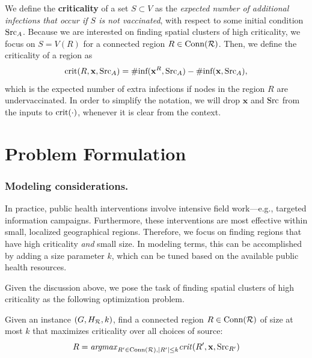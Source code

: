 \setlength{\abovedisplayskip}{3pt}
\setlength{\belowdisplayskip}{3pt}


We define the \textbf{criticality} of a set $S\subset V$ as
the \emph{expected number of additional infections that occur if $S$ is not vaccinated},
with respect to some initial condition $\text{Src}_A$.
Because we are interested on finding spatial clusters of high criticality, 
we focus on $S=V(R)$ for a connected region $R\in\text{Conn}(\mathcal{R})$.
Then, we define the criticality of a region as
\[
\text{crit}(R, \mathbf{x}, \text{Src}_A) = \#\text{inf}(\mathbf{x}^R, \text{Src}_A) - \#\text{inf}(\mathbf{x}, \text{Src}_A),
\]
which is the expected number of extra infections if nodes in the region $R$ are undervaccinated. In order to simplify the notation, we will drop $\mathbf{x}$ and $\text{Src}$ from the inputs to $\text{crit}(\cdot)$, whenever it is clear from the context.



\section{Problem Formulation}
\label{sec:problem-statement}

\subsubsection{Modeling considerations.} In practice, public health interventions involve intensive field work---e.g., targeted information campaigns. Furthermore, these interventions are most effective within small, localized geographical regions. Therefore, we focus on finding regions that have high criticality \emph{and} small size. In modeling terms, this can be accomplished by adding a size parameter $k$, which can be tuned based on the available public health resources. 

Given the discussion above, we pose the task of finding spatial clusters of high criticality as the following optimization problem.
\begin{problem}[$\maxcrit{}(G, H_{\R}, k)$]
\label{prob:maxcrit}
Given an instance $(G, H_{\mathcal{R}}, k)$, find a connected region $R\in\text{Conn}(\mathcal{R})$ of size at most $k$ that maximizes criticality over all choices of source:
\[
R= \mbox{\emph{argmax}}_{R'\in\text{Conn}(\mathcal{R}), |R'|\leq k} \text{\emph{crit}}(R', \mathbf{x}, \text{Src}_{R'})
\]
\end{problem}

